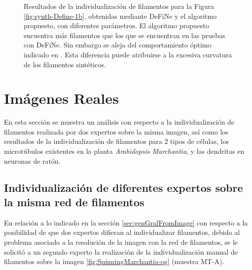 \begin{figure}[h!]
    \caption[Resultados de la individualizaci\'on de filamentos para la Figura \ref{fig:synth-Define-1b}, obtenidas mediante DeFiNe y el algoritmo propuesto, con diferentes par\'ametros.]{Resultados de la individualizaci\'on de filamentos para la Figura \ref{fig:synth-Define-1b}, obtenidas mediante DeFiNe y el algoritmo propuesto, con diferentes par\'ametros. El algoritmo propuesto encuentra m\'as filamentos que los que se encuentran en las pruebas con DeFiNe. Sin embargo se aleja del comportamiento \'optimo indicado en \citet{breuer2015define}. Esta diferencia puede atribuirse a la excesiva curvatura de los filamentos sint\'eticos.}
    \label{fig:SynthDefine-Result}
\end{figure}
\clearpage
\newpage

\section{Im\'agenes Reales}

En esta secci\'on se muestra un an\'alisis con respecto a la individualizaci\'on de filamentos realizada por dos expertos sobre la misma imagen, as\'i como los resultados de la individualizaci\'on de filamentos para 2 tipos de c\'elulas, los microt\'ubulos existentes en la planta {\it Arabidopsis Marchantia}, y las dendritas en neuronas de rat\'on. 


\subsection{Individualizaci\'on de diferentes expertos sobre la misma red de filamentos}

En relaci\'on a lo indicado en la secci\'on \ref{sec:genGrafFromImage} con respecto a la posibilidad de que dos expertos difieran al individualizar filamentos, debido al problema asociado a la resoluci\'on de la imagen con la red de filamentos, se le solicit\'o a un segundo experto la realizaci\'on de la individualizaci\'on manual de filamentos sobre la imagen \ref{fig:SpinningMarchantia-og} (muestra MT-A).

